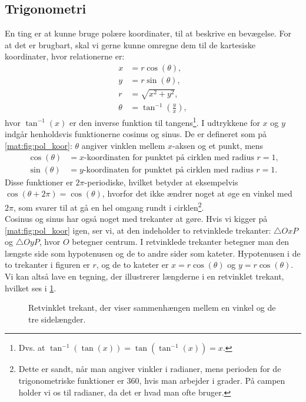 \subsection{Trigonometri}
En ting er at kunne bruge polære koordinater, til at beskrive en bevægelse. For at det er brugbart, skal vi gerne kunne omregne dem til de kartesiske koordinater, hvor relationerne er:
%
\begin{equation} \label{mat:eq:kartesisk/polaer}
\begin{aligned}
    x &= r \cos(\theta), \\
    y &= r \sin(\theta), \\
    r &= \sqrt{x^2 + y^2}, \\
    \theta &= \tan^{-1}\left(\frac{y}{x}\right),
\end{aligned}
\end{equation}
%
hvor $\tan^{-1}(x)$ er den inverse funktion til tangens\footnote{Dvs. at $\tan^{-1} \left( \tan(x) \right) = \tan \left( \tan^{-1}(x) \right) = x$.}. I udtrykkene for $x$ og $y$ indgår henholdsvis funktionerne cosinus og sinus. De er defineret som på \cref{mat:fig:pol_koor}: $\theta$ angiver vinklen mellem $x$-aksen og et punkt, mens
%
\begin{align*}
    \cos(\theta) &= \text{$x$-koordinaten for punktet på cirklen med
	radius $r = 1$,}\\
    \sin(\theta) &= \text{$y$-koordinaten for punktet på cirklen med
	radius $r = 1$.}
\end{align*}
%
Disse funktioner er $2\pi$-periodiske, hvilket betyder at eksempelvis $\cos(\theta + 2\pi) = \cos(\theta)$, hvorfor det ikke ændrer noget at øge en vinkel med $2\pi$, som svarer til at gå en hel omgang rundt i cirklen\footnote{Dette er sandt, når man angiver vinkler i radianer, mens perioden for de trigonometriske funktioner er 360, hvis man arbejder i grader. På campen holder vi os til radianer, da det er hvad man ofte bruger.}. \\
Cosinus og sinus har også noget med trekanter at gøre. Hvis vi kigger på \cref{mat:fig:pol_koor} igen, ser vi, at den indeholder to retvinklede trekanter: $\bigtriangleup OxP$ og $\bigtriangleup OyP$, hvor $O$ betegner centrum. I retvinklede trekanter betegner man den længste side som hypotenusen og de to andre sider som kateter. Hypotenusen i de to trekanter i figuren er $r$, og de to kateter er $x = r \cos(\theta)$ og $y = r \cos(\theta)$. Vi kan altså lave en tegning, der illustrerer længderne i en retvinklet trekant, hvilket ses i \cref{mat:fig:trekant}.
%
\begin{figure}
    \centering
    \caption{Retvinklet trekant, der viser sammenhængen mellem en vinkel og de tre sidelængder.}
    \label{mat:fig:trekant}
\end{figure}
